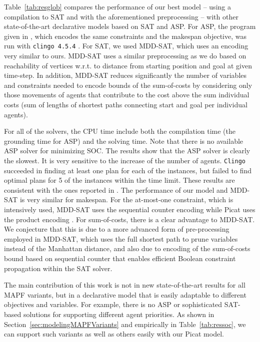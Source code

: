\documentclass[conference]{IEEEtran}
\begin{document}
Table~\ref{tab:resglob} compares the performance of our best model -- using a compilation to SAT and with the aforementioned preprocessing  -- with other state-of-the-art declarative models based on SAT and ASP. 
For ASP, the program given in \cite{ErdemKOS13}, which encodes the same constraints and the makespan objective, was run with {\tt clingo 4.5.4} \cite{clingon}. For SAT, we used MDD-SAT, which uses an encoding very similar to ours. MDD-SAT uses a similar  preprocessing as we do based on reachability of vertices w.r.t. to distance from starting position and goal at given time-step. In addition, MDD-SAT reduces significantly the number of variables and constraints needed to encode bounds of the sum-of-costs by considering only those movements of agents that contribute to the cost above the sum individual costs (sum of lengths of shortest paths connecting start and goal per individual agents).

For all of the solvers, the CPU time include both the compilation time (the grounding time for ASP) and the solving time. 
Note that there is no available ASP solver for minimizing SOC. 
The results show that the ASP solver is clearly the slowest.  It is very sensitive to the increase of the number of agents. {\tt Clingo} succeeded in finding at least one plan for each of the instances, but failed to find optimal plans for 5 of the instances within the time limit. These results are consistent with the ones reported in \cite{ErdemKOS13}. 
The performance of our model and MDD-SAT is very similar for makespan. For the at-most-one constraint, which is intensively used, MDD-SAT uses the sequential counter encoding \cite{Sinz05} while Picat uses the product encoding \cite{JChen10}. For sum-of-costs, there is a clear advantage to MDD-SAT. We conjecture that this is due to a more advanced form of pre-processing employed in MDD-SAT, which uses the full shortest path to prune variables instead of the Manhattan distance,  
and also due to encoding of the sum-of-costs bound based on sequential counter that enables efficient Boolean constraint propagation within the SAT solver. 

The main contribution of this work is not in new state-of-the-art results for all MAPF variants, but in a declarative model that is easily adaptable to different objectives and variables. For example, there is no ASP or sophisticated SAT-based solutions for supporting different agent priorities. As shown in Section~\ref{sec:modelingMAPFVariants} and empirically in Table~\ref{tab:ressoc}, we can support such variants as well as others easily with our Picat model. 
\end{document}
